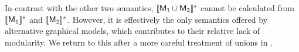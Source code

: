 \documentclass{article}
\DeclarePairedDelimiter{\UD}{\llbracket}{\rrbracket^*}
\newcommand{\sfM}{\mathsf M}
\numberwithin{equation}{section}
\begin{document}

\begin{vleftovers}

      In contrast with the other two semantics, $\UD{\sfM_1 \cup
          \sfM_2}$ cannot be calculated from $\UD{\sfM_1}$ and
        $\UD{\sfM_2}$. However, it is effectively the only semantics
        offered by alternative graphical models, which contributes to
        their relative lack of modularity. We return to this after a
        more careful treatment of unions in
        .
\end{vleftovers}
        

\end{document}
